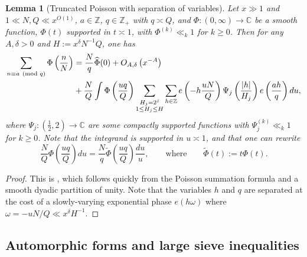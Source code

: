 \documentclass[reqno,11pt]{amsart}
\newtheorem{lemma}[theorem]{Lemma}
\theoremstyle{remark}
\numberwithin{equation}{section}
\newcommand{\Z}{\mathbb{Z}}
\newcommand{\C}{\mathbb{C}}
\renewcommand{\hat}{\widehat}
\renewcommand{\tilde}{\widetilde}
\renewcommand{\pmod}[1]{\ (\textnormal{mod } #1)}
\begin{document}
\begin{lemma}[Truncated Poisson with separation of variables] \label{lem:truncated-poisson}
Let $x \gg 1$ and $1 \ll N, Q \ll x^{O(1)}$, $a \in \Z$, $q \in \Z_+$ with $q \asymp Q$, and $\Phi : (0, \infty) \to \C$ be a smooth function, $\Phi(t)$ supported in $t \asymp 1$, with $\Phi^{(k)} \ll_k 1$ for $k \ge 0$. Then for any $A, \delta > 0$ and $H := x^\delta N^{-1} Q$, one has
\[
\begin{aligned}
    \sum_{n \equiv a \pmod{q}} \Phi\left(\frac{n}{N}\right)
    &=
    \frac{N}{q} \hat{\Phi}(0)
    +
    O_{A,\delta}\left(x^{-A}\right)
    \\
    &+
    \frac{N}{Q} \int \Phi\left(\frac{uq}{Q}\right) \sum_{\substack{H_j = 2^j \\ 1 \le H_j \le H}}
    \sum_{h \in \Z} e\left(- h\frac{uN}{Q}\right) 
     \Psi_j\left(\frac{|h|}{H_j}\right) e\left( \frac{ah}{q} \right) du,
\end{aligned}
\]
where $\Psi_j : (\frac{1}{2}, 2) \to \C$ are some compactly supported functions with $\Psi_j^{(k)} \ll_k 1$ for $k \ge 0$. Note that the integrand is supported in $u \asymp 1$, and that one can rewrite
\[
    \frac{N}{Q} \Phi\left(\frac{uq}{Q}\right) du = \frac{N}{q} \tilde\Phi\left(\frac{uq}{Q}\right) \frac{du}{u}, \qquad \text{where} \qquad \tilde\Phi(t) := t\Phi(t).
\]
\end{lemma}

\begin{proof}
This is \cite[Lemma 4]{pascadi2024large}, which follows quickly from the Poisson summation formula and a smooth dyadic partition of unity. Note that the variables $h$ and $q$ are separated at the cost of a slowly-varying exponential phase $e(h\omega)$ where $\omega = -uN/Q \ll x^\delta H^{-1}$.
\end{proof}




\subsection{Automorphic forms and large sieve inequalities} \label{subsec:automorphic-large-sieve}
\end{document}

